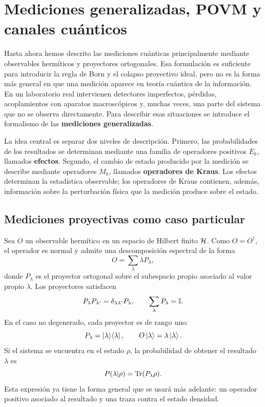 \documentclass[../main.tex]{subfiles}
\begin{document}
\chapter{Mediciones generalizadas, POVM y canales cuánticos}\label{sec:povm-canales}

Hasta ahora hemos descrito las mediciones cuánticas principalmente mediante observables hermíticos y proyectores ortogonales. Esa formulación es suficiente para introducir la regla de Born y el colapso proyectivo ideal, pero no es la forma más general en que una medición aparece en teoría cuántica de la información. En un laboratorio real intervienen detectores imperfectos, pérdidas, acoplamientos con aparatos macroscópicos y, muchas veces, una parte del sistema que no se observa directamente. Para describir esas situaciones se introduce el formalismo de las \textbf{mediciones generalizadas}.

La idea central es separar dos niveles de descripción. Primero, las probabilidades de los resultados se determinan mediante una familia de operadores positivos $E_k$, llamados \textbf{efectos}. Segundo, el cambio de estado producido por la medición se describe mediante operadores $M_k$, llamados \textbf{operadores de Kraus}. Los efectos determinan la estadística observable; los operadores de Kraus contienen, además, información sobre la perturbación física que la medición produce sobre el estado.

\section{Mediciones proyectivas como caso particular}

Sea $O$ un observable hermítico en un espacio de Hilbert finito $\mathcal{H}$. Como $O=O^\dagger$, el operador es normal y admite una descomposición espectral de la forma
\begin{equation*}
    O=\sum_{\lambda}\lambda P_\lambda,
\end{equation*}
donde $P_\lambda$ es el proyector ortogonal sobre el subespacio propio asociado al valor propio $\lambda$. Los proyectores satisfacen
\begin{equation*}
    P_\lambda P_{\lambda'}=\delta_{\lambda\lambda'}P_\lambda,
    \qquad
    \sum_\lambda P_\lambda=\mathbb{I}.
\end{equation*}
En el caso no degenerado, cada proyector es de rango uno:
\begin{equation*}
    P_\lambda=\ket{\lambda}\!\bra{\lambda},
    \qquad
    O\ket{\lambda}=\lambda\ket{\lambda}.
\end{equation*}
Si el sistema se encuentra en el estado $\rho$, la probabilidad de obtener el resultado $\lambda$ es
\begin{equation*}
    P(\lambda|\rho)=\Tr(P_\lambda\rho).
\end{equation*}
Esta expresión ya tiene la forma general que se usará más adelante: un operador positivo asociado al resultado y una traza contra el estado densidad.
\end{document}
